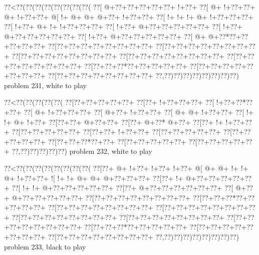 \vbox{\vbox{\goo
\0??<\0??(\0??(\0??(\0??(\0??(\0??(\0??(\0??(
\0??[\- @+\0??+\0??+\0??+\0??+\0??+\- !+\0??+
\0??[\- @+\- !+\0??+\0??+\- @+\- !+\0??+\0??+
\- @[\- !+\- @+\- @+\- @+\0??+\- !+\0??+\0??+
\0??[\- !+\- !+\- !+\- @+\- !+\0??+\0??+\0??+
\0??[\- !+\0??+\- @+\- !+\- !+\0??+\0??+\0??+
\0??[\- !+\0??+\- @+\0??+\0??+\0??+\0??+\0??+
\0??[\- !+\0??+\- @+\0??+\0??+\0??+\0??+\0??+
\0??[\- !+\0??+\- @+\0??+\0??+\0??+\0??+\0??+
\0??[\- @+\- @+\0??*\0??+\0??+\0??+\0??+\0??+
\0??[\0??+\0??+\0??+\0??+\0??+\0??+\0??+\0??+
\0??[\0??+\0??+\0??+\0??+\0??+\0??+\0??+\0??+
\0??[\0??+\0??+\0??+\0??+\0??+\0??+\0??+\0??+
\0??[\0??+\0??+\0??+\0??+\0??+\0??+\0??+\0??+
\0??[\0??+\0??+\0??+\0??+\0??+\0??+\0??+\0??+
\0??[\0??+\0??+\0??*\0??+\0??+\0??+\0??+\0??+
\0??[\0??+\0??+\0??+\0??+\0??+\0??+\0??+\0??+
\0??[\0??+\0??+\0??+\0??+\0??+\0??+\0??+\0??+
\0??,\0??)\0??)\0??)\0??)\0??)\0??)\0??)\0??)
}
\hfil problem 231, white to play\hfil\break
}

\vbox{\vbox{\goo
\0??<\0??(\0??(\0??(\0??(\0??(
\0??[\0??+\0??+\0??+\0??+\0??+
\0??[\0??+\- !+\0??+\0??+\0??+
\0??[\- !+\0??+\0??*\0??+\0??+
\0??[\- @+\- !+\0??+\0??+\0??+
\0??[\- @+\0??+\- !+\0??+\0??+
\0??[\- @+\- @+\- !+\0??+\0??+
\0??[\- !+\- !+\- @+\- !+\0??+
\0??[\0??+\0??+\- @+\0??+\0??+
\0??[\0??+\- @+\0??*\- @+\0??+
\0??[\0??+\- !+\- !+\0??+\0??+
\0??[\0??+\0??+\0??+\0??+\0??+
\0??[\0??+\0??+\- !+\0??+\0??+
\0??[\0??+\0??+\0??+\0??+\0??+
\0??[\0??+\0??+\0??+\0??+\0??+
\0??[\0??+\0??+\0??*\0??+\0??+
\0??[\0??+\0??+\0??+\0??+\0??+
\0??[\0??+\0??+\0??+\0??+\0??+
\0??,\0??)\0??)\0??)\0??)\0??)
}
\hfil problem 232, white to play\hfil\break
}

\vbox{\vbox{\goo
\0??<\0??(\0??(\0??(\0??(\0??(\0??(\0??(\0??(
\0??[\0??+\- @+\- !+\0??+\- !+\0??+\- !+\0??+
\- @[\- @+\- @+\- !+\- !+\- @+\- !+\0??+\0??+
\- ![\- !+\- !+\- @+\- @+\- @+\0??+\0??+\0??+
\0??[\0??+\- !+\- @+\0??+\0??+\0??+\0??+\0??+
\0??[\- !+\- !+\- @+\0??+\0??+\0??+\0??+\0??+
\0??[\0??+\- @+\0??+\0??+\0??+\0??+\0??+\0??+
\0??[\- @+\0??+\- @+\0??+\0??+\0??+\0??+\0??+
\0??[\0??+\0??+\0??+\0??+\0??+\0??+\0??+\0??+
\0??[\0??+\0??+\0??*\0??+\0??+\0??+\0??+\0??+
\0??[\0??+\0??+\0??+\0??+\0??+\0??+\0??+\0??+
\0??[\0??+\0??+\0??+\0??+\0??+\0??+\0??+\0??+
\0??[\0??+\0??+\0??+\0??+\0??+\0??+\0??+\0??+
\0??[\0??+\0??+\0??+\0??+\0??+\0??+\0??+\0??+
\0??[\0??+\0??+\0??+\0??+\0??+\0??+\0??+\0??+
\0??[\0??+\0??+\0??*\0??+\0??+\0??+\0??+\0??+
\0??[\0??+\0??+\0??+\0??+\0??+\0??+\0??+\0??+
\0??[\0??+\0??+\0??+\0??+\0??+\0??+\0??+\0??+
\0??,\0??)\0??)\0??)\0??)\0??)\0??)\0??)\0??)
}
\hfil problem 233, black to play\hfil\break
}

